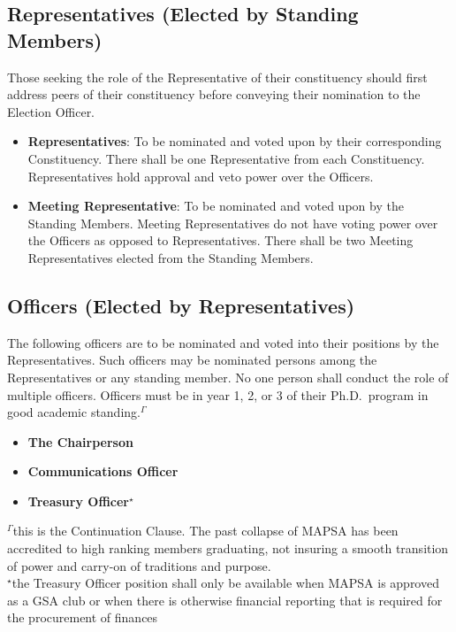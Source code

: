 \documentclass[8pt]{article}
\begin{document}
	\subsection{Representatives (Elected by Standing Members)}\label{subsec:rep}
	Those seeking the role of the Representative of their constituency should first address peers of their constituency before conveying their nomination to the Election Officer. 
	\begin{itemize}
		\item \textbf{Representatives}: To be nominated and voted upon by their corresponding Constituency. There shall be one Representative from each Constituency. Representatives hold approval and veto power over the Officers.
		\item \textbf{Meeting Representative}: To be nominated and voted upon by the Standing Members. Meeting Representatives do not have voting power over the Officers as opposed to Representatives. There shall be two Meeting Representatives elected from the Standing Members.
	\end{itemize}
	\subsection{Officers (Elected by Representatives)}\label{subsec:off}
	The following officers are to be nominated and voted into their positions by the Representatives. Such officers may be nominated persons among the Representatives or any standing member. No one person shall conduct the role of multiple officers. Officers must be in year 1, 2, or 3 of their Ph.D.~program in good academic standing.$^\Gamma$
	\begin{itemize}
		\item \textbf{The Chairperson}
		\item \textbf{Communications Officer}
		\item \textbf{Treasury Officer$^\star$}
	\end{itemize}
	$^\Gamma$this is the Continuation Clause. The past collapse of MAPSA has been accredited to high ranking members graduating, not insuring a smooth transition of power and carry-on of traditions and purpose.\\
	$^\star$the Treasury Officer position shall only be available when MAPSA is approved as a GSA club or when there is otherwise financial reporting that is required for the procurement of finances\\
\end{document}
